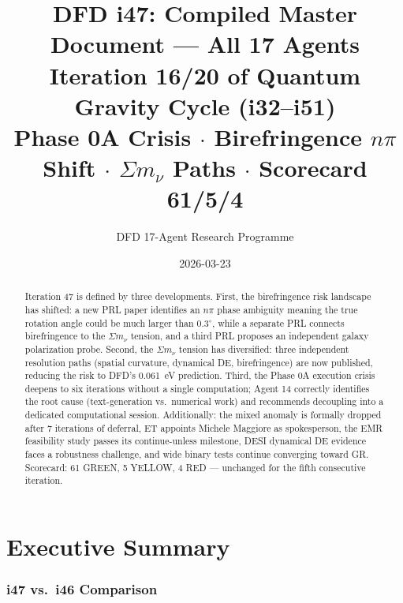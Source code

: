 \documentclass[11pt,a4paper]{article}
\title{DFD i47: Compiled Master Document --- All 17 Agents\\[6pt]
\large Iteration 16/20 of Quantum Gravity Cycle (i32--i51)\\[6pt]
\normalsize Phase 0A Crisis $\cdot$ Birefringence $n\pi$ Shift $\cdot$ $\Sigma m_\nu$ Paths $\cdot$ Scorecard 61/5/4}
\author{DFD 17-Agent Research Programme}
\date{2026-03-23}
\begin{document}
\maketitle

\begin{abstract}
Iteration 47 is defined by three developments. First, the birefringence risk landscape has shifted: a new PRL paper identifies an $n\pi$ phase ambiguity meaning the true rotation angle could be much larger than $0.3^\circ$, while a separate PRL connects birefringence to the $\Sigma m_\nu$ tension, and a third PRL proposes an independent galaxy polarization probe. Second, the $\Sigma m_\nu$ tension has diversified: three independent resolution paths (spatial curvature, dynamical DE, birefringence) are now published, reducing the risk to DFD's 0.061~eV prediction. Third, the Phase 0A execution crisis deepens to six iterations without a single computation; Agent 14 correctly identifies the root cause (text-generation vs.\ numerical work) and recommends decoupling into a dedicated computational session. Additionally: the mixed anomaly is formally dropped after 7 iterations of deferral, ET appoints Michele Maggiore as spokesperson, the EMR feasibility study passes its continue-unless milestone, DESI dynamical DE evidence faces a robustness challenge, and wide binary tests continue converging toward GR. Scorecard: 61 GREEN, 5 YELLOW, 4 RED --- unchanged for the fifth consecutive iteration.
\end{abstract}

\tableofcontents
\newpage

\part{Executive Summary}

\section{i47 vs.\ i46 Comparison}
\end{document}
